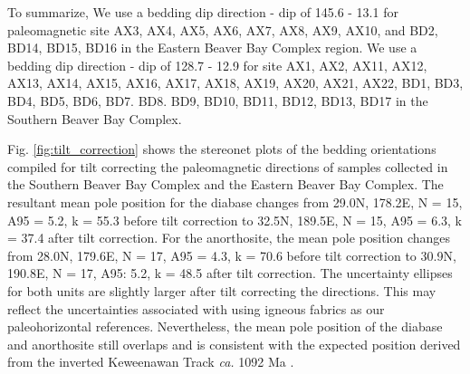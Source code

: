 \documentclass[11pt,letterpaper]{article}
\begin{document}
To summarize, We use a bedding dip direction - dip of 145.6 - 13.1 for paleomagnetic site AX3, AX4, AX5, AX6, AX7, AX8, AX9, AX10, and BD2, BD14, BD15, BD16 in the Eastern Beaver Bay Complex region. We use a bedding dip direction - dip of 128.7 - 12.9 for site AX1, AX2, AX11, AX12, AX13, AX14, AX15, AX16, AX17, AX18, AX19, AX20, AX21, AX22, BD1, BD3, BD4, BD5, BD6, BD7. BD8. BD9, BD10, BD11, BD12, BD13, BD17 in the Southern Beaver Bay Complex.

Fig. \ref{fig:tilt_correction} shows the stereonet plots of the bedding orientations compiled for tilt correcting the paleomagnetic directions of samples collected in the Southern Beaver Bay Complex and the Eastern Beaver Bay Complex. The resultant mean pole position for the diabase changes from 29.0\textdegree N, 178.2\textdegree E, N = 15, A95 = 5.2, k = 55.3 before tilt correction to 32.5\textdegree N, 189.5\textdegree E, N = 15, A95 = 6.3, k = 37.4 after tilt correction. For the anorthosite, the mean pole position changes from 28.0\textdegree N, 179.6\textdegree E, N = 17, A95 = 4.3, k = 70.6 before tilt correction to 30.9\textdegree N, 190.8\textdegree E, N = 17, A95: 5.2, k = 48.5 after tilt correction. The uncertainty ellipses for both units are slightly larger after tilt correcting the directions. This may reflect the uncertainties associated with using igneous fabrics as our paleohorizontal references. Nevertheless, the mean pole position of the diabase and anorthosite still overlaps and is consistent with the expected position derived from the inverted Keweenawan Track \textit{ca.} 1092 Ma \citep{Swanson-Hysell2019a}. 


\clearpage


\clearpage



\clearpage


\end{document}
